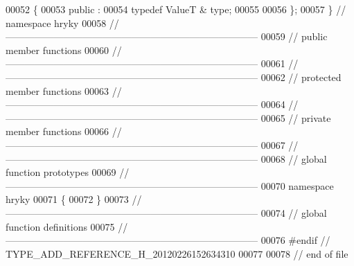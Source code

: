 \begin{DoxyCode}
00052 \{
00053 \textcolor{keyword}{public} :
00054     \textcolor{keyword}{typedef} ValueT &       type;
00055 
00056 \};
00057 \} \textcolor{comment}{// namespace hryky}
00058 \textcolor{comment}{//
      ------------------------------------------------------------------------------}
00059 \textcolor{comment}{// public member functions}
00060 \textcolor{comment}{//
      ------------------------------------------------------------------------------}
00061 \textcolor{comment}{//
      ------------------------------------------------------------------------------}
00062 \textcolor{comment}{// protected member functions}
00063 \textcolor{comment}{//
      ------------------------------------------------------------------------------}
00064 \textcolor{comment}{//
      ------------------------------------------------------------------------------}
00065 \textcolor{comment}{// private member functions}
00066 \textcolor{comment}{//
      ------------------------------------------------------------------------------}
00067 \textcolor{comment}{//
      ------------------------------------------------------------------------------}
00068 \textcolor{comment}{// global function prototypes}
00069 \textcolor{comment}{//
      ------------------------------------------------------------------------------}
00070 \textcolor{keyword}{namespace }hryky
00071 \{
00072 \}
00073 \textcolor{comment}{//
      ------------------------------------------------------------------------------}
00074 \textcolor{comment}{// global function definitions}
00075 \textcolor{comment}{//
      ------------------------------------------------------------------------------}
00076 \textcolor{preprocessor}{#endif // TYPE\_ADD\_REFERENCE\_H\_20120226152634310}
00077 \textcolor{preprocessor}{}
00078 \textcolor{comment}{// end of file}
\end{DoxyCode}
